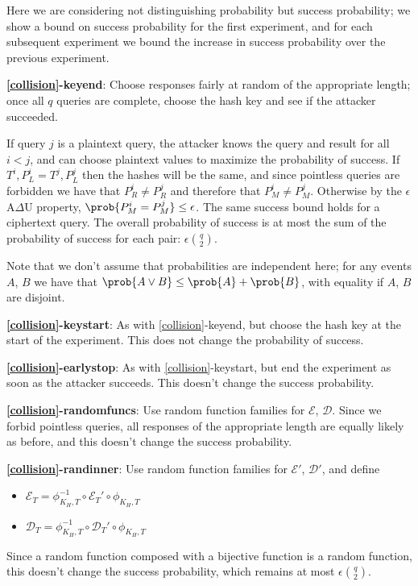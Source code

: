 \documentclass[journal=tosc,preprint,floatrow,submission]{iacrtrans}
\newcommand*{\xprm}[2]{\textsf{\ref*{#1}-#2}}
\newcommand*{\xprmtitle}[2]{\textbf{\xprm{#1}{#2}}}
\newcommand*{\calE}{\mathcal{E}}
\newcommand*{\calD}{\mathcal{D}}
\begin{document}
Here we are considering not distinguishing probability but success probability; we
show a bound on success probability for the first experiment, and for each subsequent experiment
we bound the increase in success probability over the previous experiment.

\xprmtitle{collision}{keyend}: Choose responses fairly at random of the appropriate length;
once all $q$ queries are complete, choose the hash key and see if the attacker succeeded.

If query $j$ is a plaintext query, the attacker knows the query and result
for all $i < j$, and can choose plaintext values to maximize the probability of success.
If $T^i, P_L^i = T^j, P_L^j$ then the hashes will be the same, and since pointless
queries are forbidden we have that $P_R^i \neq P_R^j$ and therefore that
$P_M^i \neq P_M^j$. Otherwise by the $\epsilon$A$\Delta$U property,
$\prob{P_M^i = P_M^j} \leq \epsilon$. The same success bound holds for a ciphertext query.
The overall probability of success
is at most the sum of the probability of success for each pair:
$\epsilon\binom{q}{2}$.

Note that we don't assume that probabilities are independent here;
for any events $A$, $B$ we have that $\prob{A \vee B} \leq \prob{A} + \prob{B}$, with
equality if $A$, $B$ are disjoint.

\xprmtitle{collision}{keystart}: As with \xprm{collision}{keyend}, but
choose the hash key at the start of the experiment. This
does not change the probability of success.

\xprmtitle{collision}{earlystop}: As with \xprm{collision}{keystart}, but
end the experiment as soon as the attacker succeeds.
This doesn't change the success probability.

\xprmtitle{collision}{randomfuncs}: Use random function families for $\calE$,
$\calD$. Since we forbid pointless queries,
all responses of the appropriate length are equally likely as before,
and this doesn't change the success probability.

\xprmtitle{collision}{randinner}: Use random function families for $\calE'$, $\calD'$, and define
\begin{itemize}
    \item $\calE_T = \phi^{-1}_{K_H, T} \circ \calE_T' \circ \phi_{K_H, T}$
    \item $\calD_T = \phi^{-1}_{K_H, T} \circ \calD_T' \circ \phi_{K_H, T}$
\end{itemize}

Since a random function composed with a bijective function is a random function,
this doesn't change the success probability, which remains at most
$\epsilon\binom{q}{2}$.
\end{document}
